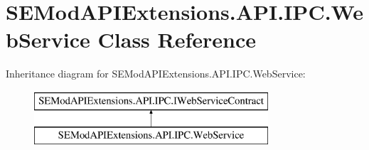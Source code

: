 \hypertarget{class_s_e_mod_a_p_i_extensions_1_1_a_p_i_1_1_i_p_c_1_1_web_service}{}\section{S\+E\+Mod\+A\+P\+I\+Extensions.\+A\+P\+I.\+I\+P\+C.\+Web\+Service Class Reference}
\label{class_s_e_mod_a_p_i_extensions_1_1_a_p_i_1_1_i_p_c_1_1_web_service}
Inheritance diagram for S\+E\+Mod\+A\+P\+I\+Extensions.\+A\+P\+I.\+I\+P\+C.\+Web\+Service\+:\begin{figure}[H]
\begin{center}
\leavevmode
\includegraphics[height=2.000000cm]{class_s_e_mod_a_p_i_extensions_1_1_a_p_i_1_1_i_p_c_1_1_web_service}
\end{center}
\end{figure}
